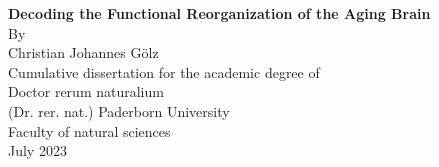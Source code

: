 \begin{titlepage}
    \begin{center}
        \vspace*{1cm}
        \LARGE
        \textbf{Decoding the Functional Reorganization of the Aging Brain}\\
        \vspace{1.5cm}
        \Large
        By\\
        \vspace{0.5cm}
        Christian Johannes Gölz\\
        \vspace{0.5cm}       
        Cumulative dissertation for the academic degree of\\
        Doctor rerum naturalium\\
        (Dr. rer. nat.)
        \vfill
        \Large
        Paderborn University\\
        Faculty of natural sciences\\
        July 2023
            
    \end{center}
\end{titlepage}

